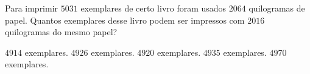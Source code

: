 Para imprimir $5031$ exemplares de certo livro foram usados $2064$ quilogramas de papel. Quantos exemplares desse livro podem ser impressos com $2016$ quilogramas do mesmo papel?

$4914$ exemplares.
$4926$ exemplares.
$4920$ exemplares.
$4935$ exemplares.
$4970$ exemplares.



